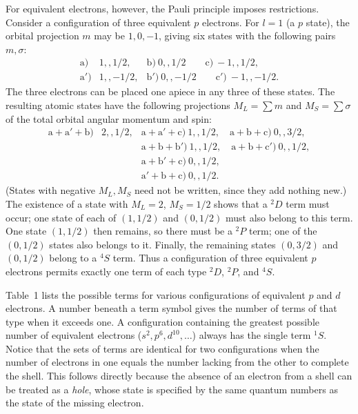 For equivalent electrons, however, the Pauli principle imposes restrictions. Consider a configuration of three equivalent $p$ electrons. For $l=1$ (a $p$ state), the orbital projection $m$ may be $1,0,-1$, giving six states with the following pairs $m,\sigma$:
\[
\begin{array}{lll}
\mathrm a)&1,,1/2,&\mathrm b)\ 0,,1/2\qquad \mathrm c)\ -1,,1/2,\\
\mathrm a')&1,,-1/2,&\mathrm b')\ 0,,-1/2\qquad \mathrm c')\ -1,,-1/2.
\end{array}
\]
The three electrons can be placed one apiece in any three of these states. The resulting atomic states have the following projections $M_L=\sum m$ and $M_S=\sum\sigma$ of the total orbital angular momentum and spin:
\[
\begin{array}{lll}
\mathrm a+\mathrm a'+\mathrm b)&2,,1/2,&
\mathrm a+\mathrm a'+\mathrm c)\ 1,,1/2,
\quad \mathrm a+\mathrm b+\mathrm c)\ 0,,3/2,\\
&&\mathrm a+\mathrm b+\mathrm b')\ 1,,1/2,
\quad \mathrm a+\mathrm b+\mathrm c')\ 0,,1/2,\\
&&\mathrm a+\mathrm b'+\mathrm c)\ 0,,1/2,\\
&&\mathrm a'+\mathrm b+\mathrm c)\ 0,,1/2.
\end{array}
\]
(States with negative $M_L,M_S$ need not be written, since they add nothing new.) The existence of a state with $M_L=2$, $M_S=1/2$ shows that a ${}^2D$ term must occur; one state of each of $(1,1/2)$ and $(0,1/2)$ must also belong to this term. One state $(1,1/2)$ then remains, so there must be a ${}^2P$ term; one of the $(0,1/2)$ states also belongs to it. Finally, the remaining states $(0,3/2)$ and $(0,1/2)$ belong to a ${}^4S$ term. Thus a configuration of three equivalent $p$ electrons permits exactly one term of each type ${}^2D$, ${}^2P$, and ${}^4S$.

Table~1 lists the possible terms for various configurations of equivalent $p$ and $d$ electrons. A number beneath a term symbol gives the number of terms of that type when it exceeds one. A configuration containing the greatest possible number of equivalent electrons ($s^2,p^6,d^{10},\ldots$) always has the single term ${}^1S$. Notice that the sets of terms are identical for two configurations when the number of electrons in one equals the number lacking from the other to complete the shell. This follows directly because the absence of an electron from a shell can be treated as a \emph{hole}, whose state is specified by the same quantum numbers as the state of the missing electron.

